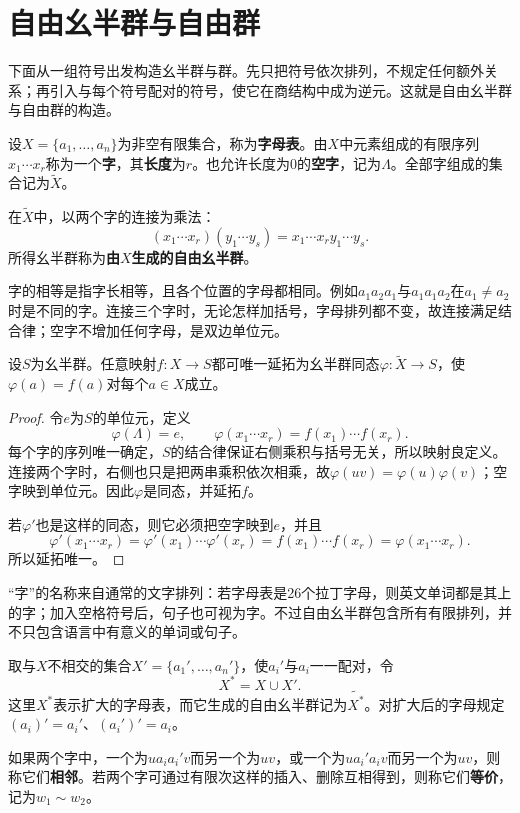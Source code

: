 \section{自由幺半群与自由群}

下面从一组符号出发构造幺半群与群。先只把符号依次排列，不规定任何额外关系；再引入与每个符号配对的符号，使它在商结构中成为逆元。这就是自由幺半群与自由群的构造。

\begin{definition}
设$X=\{a_1,\ldots,a_n\}$为非空有限集合，称为\textbf{字母表}。由$X$中元素组成的有限序列$x_1\cdots x_r$称为一个\textbf{字}，其\textbf{长度}为$r$。也允许长度为0的\textbf{空字}，记为$\Lambda$。全部字组成的集合记为$\widetilde X$。

在$\widetilde X$中，以两个字的连接为乘法：
\[
(x_1\cdots x_r)(y_1\cdots y_s)=x_1\cdots x_ry_1\cdots y_s.
\]
所得幺半群称为\textbf{由$X$生成的自由幺半群}。
\end{definition}

字的相等是指字长相等，且各个位置的字母都相同。例如$a_1a_2a_1$与$a_1a_1a_2$在$a_1\ne a_2$时是不同的字。连接三个字时，无论怎样加括号，字母排列都不变，故连接满足结合律；空字不增加任何字母，是双边单位元。

\begin{theorem}
设$S$为幺半群。任意映射$f:X\to S$都可唯一延拓为幺半群同态$\varphi:\widetilde X\to S$，使$\varphi(a)=f(a)$对每个$a\in X$成立。
\end{theorem}
\begin{proof}
令$e$为$S$的单位元，定义
\[
\varphi(\Lambda)=e,\qquad
\varphi(x_1\cdots x_r)=f(x_1)\cdots f(x_r).
\]
每个字的序列唯一确定，$S$的结合律保证右侧乘积与括号无关，所以映射良定义。连接两个字时，右侧也只是把两串乘积依次相乘，故$\varphi(uv)=\varphi(u)\varphi(v)$；空字映到单位元。因此$\varphi$是同态，并延拓$f$。

若$\varphi'$也是这样的同态，则它必须把空字映到$e$，并且
\[
\varphi'(x_1\cdots x_r)=\varphi'(x_1)\cdots\varphi'(x_r)
=f(x_1)\cdots f(x_r)=\varphi(x_1\cdots x_r).
\]
所以延拓唯一。
\end{proof}

“字”的名称来自通常的文字排列：若字母表是26个拉丁字母，则英文单词都是其上的字；加入空格符号后，句子也可视为字。不过自由幺半群包含所有有限排列，并不只包含语言中有意义的单词或句子。

\begin{construction}
取与$X$不相交的集合$X'=\{a_1',\ldots,a_n'\}$，使$a_i'$与$a_i$一一配对，令
\[
X^*=X\cup X'.
\]
这里$X^*$表示扩大的字母表，而它生成的自由幺半群记为$\widetilde{X^*}$。对扩大后的字母规定$(a_i)'=a_i'$、$(a_i')'=a_i$。

如果两个字中，一个为$ua_ia_i'v$而另一个为$uv$，或一个为$ua_i'a_iv$而另一个为$uv$，则称它们\textbf{相邻}。若两个字可通过有限次这样的插入、删除互相得到，则称它们\textbf{等价}，记为$w_1\sim w_2$。
\end{construction}

